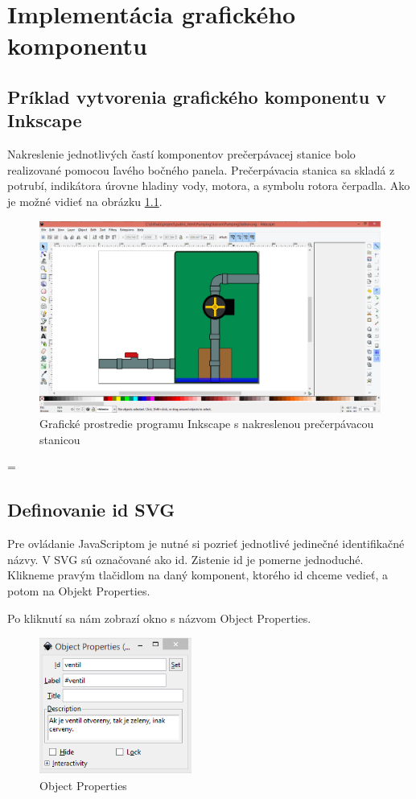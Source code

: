 \chapter{Implementácia grafického komponentu}


\section{Príklad vytvorenia grafického komponentu v Inkscape}

Nakreslenie jednotlivých častí komponentov prečerpávacej stanice bolo realizované pomocou ľavého bočného panela. Prečerpávacia stanica sa skladá z potrubí, indikátora úrovne hladiny vody, motora, a symbolu rotora čerpadla. Ako je možné vidieť na obrázku  \ref{picture1}.  


\begin{figure}[H]
	\begin{center}
		\includegraphics[width=0.7\linewidth] {obrazky/obr1.png}
		\caption{Grafické prostredie programu Inkscape s nakreslenou prečerpávacou stanicou}
		\label{picture1}
	\end{center}
\end{figure}
=


\section{Definovanie id SVG}

Pre ovládanie JavaScriptom je nutné si pozrieť jednotlivé jedinečné identifikačné názvy. V SVG sú označované ako id. Zistenie id je pomerne jednoduché. Klikneme pravým tlačidlom na daný komponent, ktorého id chceme vedieť, a potom na Objekt Properties.

Po kliknutí sa nám zobrazí okno s názvom Object Properties. 

\begin{figure}[H]
	\begin{center}
		\includegraphics [width=5cm]  {obrazky/obr3.png}
		\caption{Object Properties}
		\label{picture3}
	\end{center}
\end{figure}


